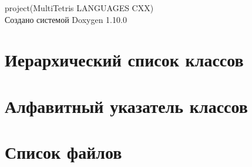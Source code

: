 \documentclass[twoside]{book}
\newcommand{\+}{\discretionary{\mbox{\scriptsize$\hookleftarrow$}}{}{}}
\newcommand{\clearemptydoublepage}{%
    \newpage{\pagestyle{empty}\cleardoublepage}%
  }
\begin{document}
  \raggedbottom
    \hypersetup{pageanchor=false,
                bookmarksnumbered=true,
                pdfencoding=unicode
               }
  \begin{titlepage}
  \vspace*{7cm}
  \begin{center}%
  {\Large project(\+Multi\+Tetris LANGUAGES CXX)}\\
  \vspace*{1cm}
  {\large Создано системой Doxygen 1.10.0}\\
  \end{center}
  \end{titlepage}
  \clearemptydoublepage
  \tableofcontents
  \clearemptydoublepage
  \hypersetup{pageanchor=true}
\chapter{Иерархический список классов}

\chapter{Алфавитный указатель классов}

\chapter{Список файлов}

\end{document}
